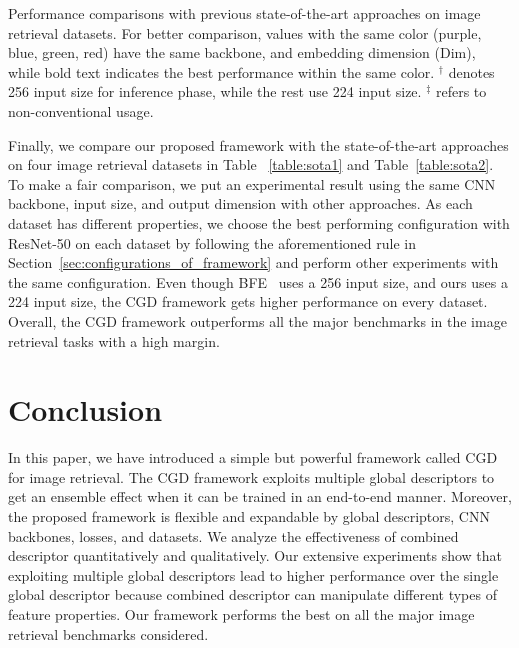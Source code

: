 \documentclass[10pt,twocolumn,letterpaper]{article}
\begin{document}
\begin{CJK}{UTF8}{mj}
\begin{table*}[h!t]
\begin{center}
\vspace{1em}
\caption{Performance comparisons with previous state-of-the-art approaches on image retrieval datasets.
For better comparison, values with the same color ({\color{Plum}purple}, {\color{blue}blue}, {\color{OliveGreen}green}, {\color{red} red}) have the same backbone, and embedding dimension (Dim), while bold text indicates the best performance within the same color.
$^\dagger$ denotes 256 input size for inference phase, while the rest use 224 input size.
$^\ddagger$ refers to non-conventional usage.}
\label{table:sota}
\end{center}
\vspace{-1em}
\end{table*}

Finally, we compare our proposed framework with the state-of-the-art approaches on four image retrieval datasets in Table ~\ref{table:sota1} and Table~\ref{table:sota2}.
To make a fair comparison, we put an experimental result using the same CNN backbone, input size, and output dimension with other approaches.
As each dataset has different properties, we choose the best performing configuration with ResNet-50 on each dataset by following the aforementioned rule in Section~\ref{sec:configurations_of_framework} and perform other experiments with the same configuration.
Even though BFE~\cite{dai2018batch} uses a 256 input size, and ours uses a 224 input size, the CGD framework gets higher performance on every dataset.
Overall, the CGD framework outperforms all the major benchmarks in the image retrieval tasks with a high margin.

\section{Conclusion}

In this paper, we have introduced a simple but powerful framework called CGD for image retrieval.
The CGD framework exploits multiple global descriptors to get an ensemble effect when it can be trained in an end-to-end manner.
Moreover, the proposed framework is flexible and expandable by global descriptors, CNN backbones, losses, and datasets.
We analyze the effectiveness of combined descriptor quantitatively and qualitatively.
Our extensive experiments show that exploiting multiple global descriptors lead to higher performance over the single global descriptor because combined descriptor can manipulate different types of feature properties.
Our framework performs the best on all the major image retrieval benchmarks considered.




{\small


}

\end{CJK}
\end{document}
